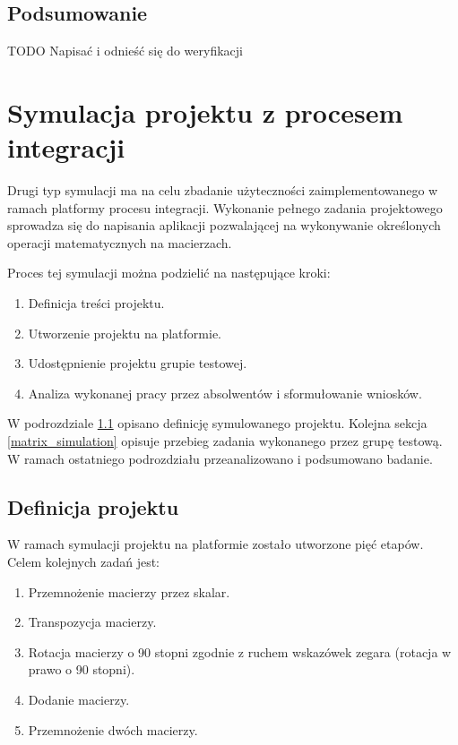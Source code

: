 \subsection{Podsumowanie}

TODO Napisać i odnieść się do weryfikacji


\section{Symulacja projektu z procesem integracji}
\label{research_matrix}

Drugi typ symulacji ma na celu zbadanie użyteczności zaimplementowanego w ramach platformy procesu integracji.
Wykonanie pełnego zadania projektowego sprowadza się do napisania aplikacji pozwalającej na wykonywanie określonych operacji matematycznych na macierzach.

Proces tej symulacji można podzielić na następujące kroki:
\begin{enumerate}
    \item Definicja treści projektu.
    \item Utworzenie projektu na platformie.
    \item Udostępnienie projektu grupie testowej.
    \item Analiza wykonanej pracy przez absolwentów i sformułowanie wniosków.
\end{enumerate}

W podrozdziale \ref{matrix_project_definition} opisano definicję symulowanego projektu.
Kolejna sekcja \ref{matrix_simulation} opisuje przebieg zadania wykonanego przez grupę testową.
W ramach ostatniego podrozdziału przeanalizowano i podsumowano badanie.


\subsection{Definicja projektu}
\label{matrix_project_definition}

W ramach symulacji projektu na platformie zostało utworzone pięć etapów.
Celem kolejnych zadań jest:
\begin{enumerate}
    \item Przemnożenie macierzy przez skalar.
    \item Transpozycja macierzy.
    \item Rotacja macierzy o 90 stopni zgodnie z ruchem wskazówek zegara (rotacja w prawo o 90 stopni).
    \item Dodanie macierzy.
    \item Przemnożenie dwóch macierzy.
\end{enumerate}

